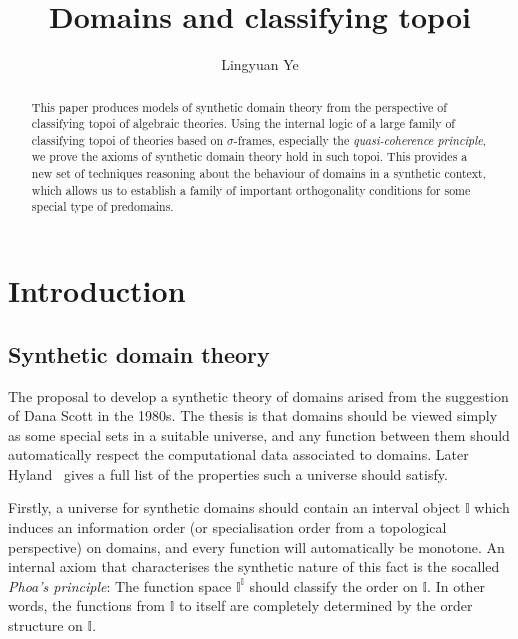 \documentclass[12pt]{amsart}
\title{Domains and classifying topoi}
\author{Lingyuan Ye}
\theoremstyle{definition}
\newcommand{\mbb}[1]{\mathbb{#1}}
\newcommand{\I}{\mbb I}
\begin{document}
%

%
%

%
%
\begin{abstract}
  This paper produces models of synthetic domain theory from the perspective of classifying topoi of algebraic theories. Using the internal logic of a large family of classifying topoi of theories based on $\sigma$-frames, especially the \emph{quasi-coherence principle}, we prove the axioms of synthetic domain theory hold in such topoi. This provides a new set of techniques reasoning about the behaviour of domains in a synthetic context, which allows us to establish a family of important orthogonality conditions for some special type of predomains.
\end{abstract}
%
\maketitle              %
%

\section{Introduction}\label{sec:intro}

\subsection{Synthetic domain theory}\label{subsec:sdt}

The proposal to develop a synthetic theory of domains arised from the suggestion of Dana Scott in the 1980s. The thesis is that domains should be viewed simply as some special sets in a suitable universe, and any function between them should automatically respect the computational data associated to domains. Later Hyland~\cite{hyland2006first} gives a full list of the properties such a universe should satisfy.

Firstly, a universe for synthetic domains should contain an interval object $\I$ which induces an information order (or specialisation order from a topological perspective) on domains, and every function will automatically be monotone. An internal axiom that characterises the synthetic nature of this fact is the socalled \emph{Phoa's principle}: The function space $\I^\I$ should classify the order on $\I$. In other words, the functions from $\I$ to itself are completely determined by the order structure on $\I$. 
\end{document}
